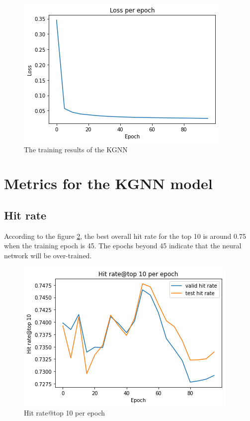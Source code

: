 \documentclass[11pt,twoside]{report}
\begin{document}
\begin{figure}[H]
    \centering
    \includegraphics[scale=0.9]{training_results.png}
    \caption{The training results of the KGNN}
    \label{fig:training_results}
\end{figure}

\section{Metrics for the KGNN model}
\subsection{Hit rate}
According to the figure \ref{fig:hitrate_10}, the best overall hit rate for the top 10 is around 0.75 when the training epoch is 45. The epochs beyond 45 indicate that the neural network will be over-trained.

\begin{figure}[H]
    \centering
    \includegraphics[scale=0.9]{hitrate@10.png}
    \caption{Hit rate@top 10 per epoch}
    \label{fig:hitrate_10}
\end{figure}
\end{document}
